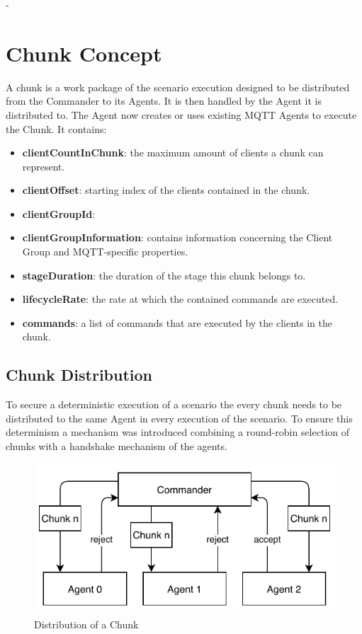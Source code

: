 -\section{Chunk Concept}
A chunk is a work package of the scenario execution designed to be distributed from the Commander to its Agents.
It is then handled by the Agent it is distributed to.
The Agent now creates or uses existing MQTT Agents to execute the Chunk.
It contains:
\begin{itemize}
	\item \textbf{clientCountInChunk}: the maximum amount of clients a chunk can represent.
	\item \textbf{clientOffset}: starting index of the clients contained in the chunk.
	\item \textbf{clientGroupId}: 
	\item \textbf{clientGroupInformation}: contains information concerning the Client Group and MQTT-specific properties.
	\item \textbf{stageDuration}: the duration of the stage this chunk belongs to.
	\item \textbf{lifecycleRate}: the rate at which the contained commands are executed.
	\item \textbf{commands}: a list of commands that are executed by the clients in the chunk.
\end{itemize}

\subsection{Chunk Distribution}
To secure a deterministic execution of a scenario the every chunk needs to be distributed to the same Agent in every execution of the scenario.
To ensure this determinism a mechanism was introduced combining a round-robin selection of chunks with a handshake mechanism of the agents.
\begin{figure}[h]
	\begin{center}
	\includegraphics[scale=1]{Resources/PDF/ChunkDistribution}
	\caption{Distribution of a Chunk}
	\label{pic:ChunkDistribution}
	\end{center}
\end{figure}

